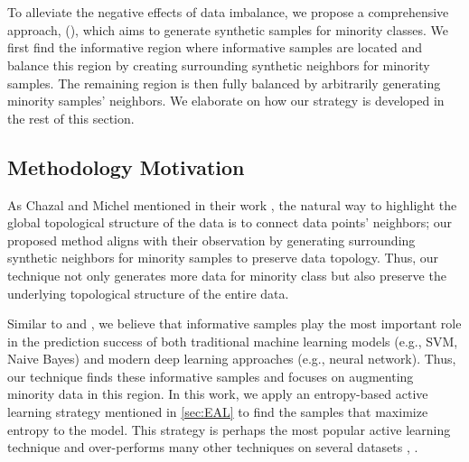 

\section{\MethodnameLong}
\label{sec:SIMPOR_method}
To alleviate the negative effects of data imbalance, we propose a comprehensive approach, \MethodnameLongSIMPOR{} (\Methodname), which aims to generate synthetic samples for minority classes. We first find the informative region where informative samples are located and balance this region by creating surrounding synthetic neighbors for minority samples. The remaining region is then fully balanced by arbitrarily generating minority samples' neighbors. We elaborate on how our strategy is developed in the rest of this section.

\subsection{Methodology Motivation}  

As Chazal and Michel mentioned in their work \cite{leroueil_compressibility_1996}, the natural way to highlight the global topological structure of the data is to connect data points' neighbors; our proposed method aligns with their observation by generating surrounding synthetic neighbors for minority samples to preserve data topology. Thus, our technique not only generates more data for minority class but also preserve the underlying topological structure of the entire data. 

Similar to \cite{ertekin_learning_2007} and \cite{aggarwal_active_2020}, we believe that informative samples play the most important role in the prediction success of both traditional machine learning models (e.g., SVM, Naive Bayes) and modern deep learning approaches (e.g., neural network). Thus, our technique finds these informative samples and focuses on augmenting minority data in this region. In this work, we apply an entropy-based active learning strategy mentioned in \ref{sec:EAL} to find the samples that maximize entropy to the model. This strategy is perhaps the most popular active learning technique and over-performs many other techniques on several datasets \cite{DAL}, \cite{7393573} \cite{settles_analysis_2008}.

